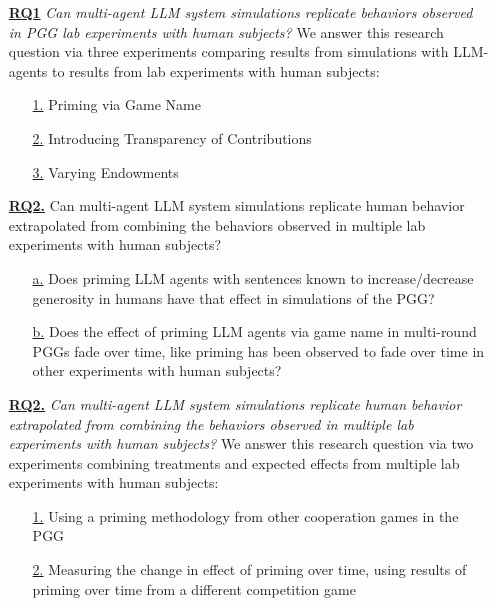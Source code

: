 \bigskip
\color{blue}

\begin{itemize}[itemindent=2.5em]
  \item[\underline{\textbf{RQ1}}] \textit{Can multi-agent LLM system simulations replicate behaviors observed in PGG lab experiments with human subjects?} We answer this research question via three experiments comparing results from simulations with LLM-agents to results from lab experiments with human subjects:
  
  \begin{itemize} [leftmargin=0.5in]
    \item[\underline{1.}] Priming via Game Name
    \item[\underline{2.}] Introducing Transparency of Contributions
    \item[\underline{3.}] Varying Endowments
  \end{itemize}
\end{itemize}

\color{black}

\bigskip

\begin{itemize}[itemindent=2.5em]

  \item[\underline{\textbf{RQ2.}}] Can multi-agent LLM system simulations replicate human behavior extrapolated from combining the behaviors observed in multiple lab experiments with human subjects?
\begin{itemize}[leftmargin=0.5in]
    \item[\underline{a.}] Does priming LLM agents with sentences known to increase/decrease generosity in humans have that effect in simulations of the PGG?
\item[\underline{b.}] Does the effect of priming LLM agents via game name in multi-round PGGs fade over time, like priming has been observed to fade over time in other experiments with human subjects?
\end{itemize}
\end{itemize}

  \bigskip
\color{blue}
\begin{itemize}[itemindent=2.5em]

  \item[\underline{\textbf{RQ2.}}] \textit{Can multi-agent LLM system simulations replicate human behavior extrapolated from combining the behaviors observed in multiple lab experiments with human subjects?} We answer this research question via two experiments combining treatments and expected effects from multiple lab experiments with human subjects:
  \begin{itemize}[leftmargin=0.5in]
    \item[\underline{1.}] Using a priming methodology from other cooperation games in the PGG
    \item[\underline{2.}] Measuring the change in effect of priming over time, using results of priming over time from a different competition game
  \end{itemize}
\end{itemize}
\color{black}


